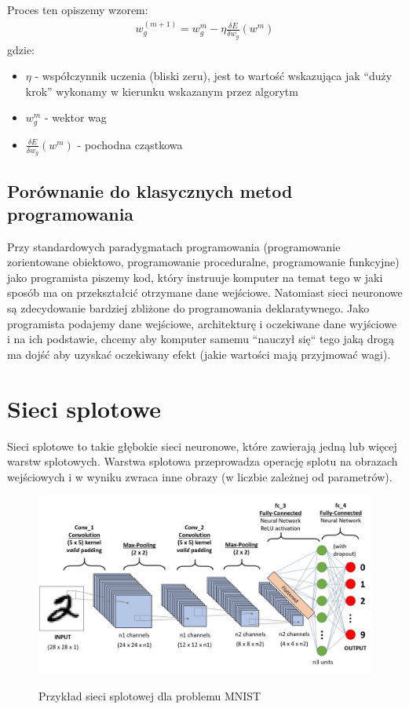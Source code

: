 \documentclass{article}
\begin{document}
Proces ten opiszemy wzorem:
\begin{align*}
    w_g^{(m+1)}=w_g^m - \eta\frac{\delta E}{\delta w_g}(w^m)
\end{align*}
gdzie:
\begin{itemize}
    \item $\eta$ - współczynnik uczenia (bliski zeru), jest to wartość wskazująca jak ``duży krok'' wykonamy w kierunku wskazanym przez algorytm
    \item $w_g^m$ - wektor wag
    \item $\frac{\delta E}{\delta w_g}(w^m)$ - pochodna cząstkowa
\end{itemize}

\subsection{Porównanie do klasycznych metod programowania}
Przy standardowych paradygmatach programowania (programowanie zorientowane obiektowo, programowanie proceduralne, programowanie funkcyjne) jako programista piszemy kod, który
instruuje komputer na temat tego w jaki sposób ma on przekształcić otrzymane dane wejściowe.
Natomiast sieci neuronowe są zdecydowanie bardziej zbliżone do programowania deklaratywnego. Jako programista podajemy dane wejściowe, architekturę i oczekiwane dane wyjściowe i na ich podstawie, chcemy aby komputer samemu ``nauczył się`` tego jaką drogą ma dojść aby uzyskać oczekiwany efekt (jakie wartości mają przyjmować wagi).
\newpage
\section{Sieci splotowe}
Sieci splotowe to takie głębokie sieci neuronowe, które zawierają jedną lub więcej warstw splotowych.
Warstwa splotowa przeprowadza operację splotu na obrazach wejściowych i w wyniku zwraca inne obrazy (w liczbie zależnej od parametrów).
\begin{figure}[H]
    \centering
    \includegraphics[width=\linewidth]{images/cnn.jpeg}
    \caption{Przykład sieci splotowej dla problemu MNIST}
    \cite{cnn}
\end{figure}
\end{document}
